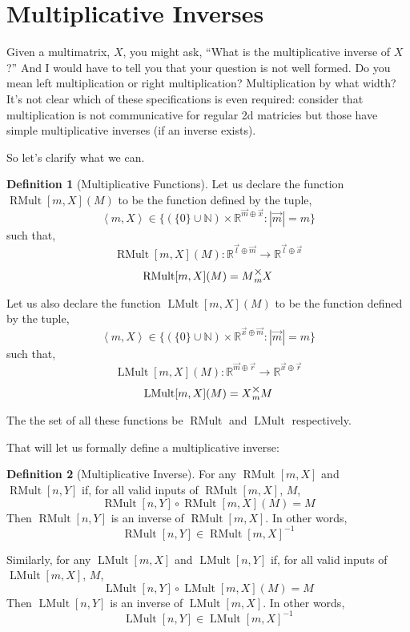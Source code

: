 \documentclass[12pt]{book}
\theoremstyle{plain}
\theoremstyle{definition}
\newtheorem{definition}{Definition}[chapter]
\theoremstyle{ppart}
\theoremstyle{case}
\theoremstyle{solution}
\DeclareMathOperator{\RMult}{RMult}
\DeclareMathOperator{\LMult}{LMult}
\newcommand{\mmult}[1]{\text{\raisebox{1ex}{$\underset{#1}{\times}$}}}
\begin{document}
\section{Multiplicative Inverses}

Given a multimatrix, $X$, you might ask, ``What is the multiplicative inverse of $X$?''
And I would have to tell you that your question is not well formed. Do you mean left multiplication
or right multiplication? Multiplication by what width? It's not clear which of these specifications
is even required: consider that multiplication is not communicative for regular 2d matricies but
those have simple multiplicative inverses (if an inverse exists). 

So let's clarify what we can.

\begin{definition}[Multiplicative Functions]
Let us declare the function $\RMult[m,X](M)$ to be the function defined 
by the tuple,
\[ \left<m,X\right> \in \{  (\{0\} \cup \mathbb{N}) \times \mathbb{R}^{\vec{m} \oplus \vec{x}}  :  |\vec{m}| = m \} \]
such that,
\[ \RMult[m,X](M) : \mathbb{R}^{\vec{l} \oplus \vec{m}} \to \mathbb{R}^{\vec{l} \oplus \vec{x}} \]
\[ \RMult[m,X](M) = M \mmult{m} X \]

Let us also declare the function $\LMult[m,X](M)$ to be the function defined 
by the tuple,
\[ \left<m,X\right> \in \{  (\{0\} \cup \mathbb{N}) \times \mathbb{R}^{\vec{x} \oplus \vec{m}}  :  |\vec{m}| = m \} \]
such that,
\[ \LMult[m,X](M) : \mathbb{R}^{\vec{m} \oplus \vec{r}} \to \mathbb{R}^{\vec{x} \oplus \vec{r}} \]
\[ \LMult[m,X](M) = X \mmult{m} M \]

The the set of all these functions be $\RMult$ and $\LMult$ respectively.
\end{definition}

That will let us formally define a multiplicative inverse:

\begin{definition}[Multiplicative Inverse]
For any $\RMult[m,X]$ and $\RMult[n,Y]$ if, for all valid inputs of $\RMult[m,X]$, $M$,
\[ \RMult[n,Y] \circ \RMult[m,X] (M) = M \]
Then $\RMult[n,Y]$ is an inverse of $\RMult[m,X]$. In other words,
\[ \RMult[n,Y] \in \RMult[m,X]^{-1} \]

Similarly, for any $\LMult[m,X]$ and $\LMult[n,Y]$ if, for all valid inputs of $\LMult[m,X]$, $M$,
\[ \LMult[n,Y] \circ \LMult[m,X] (M) = M \]
Then $\LMult[n,Y]$ is an inverse of $\LMult[m,X]$. In other words,
\[ \LMult[n,Y] \in \LMult[m,X]^{-1} \]
\end{definition}
\end{document}
